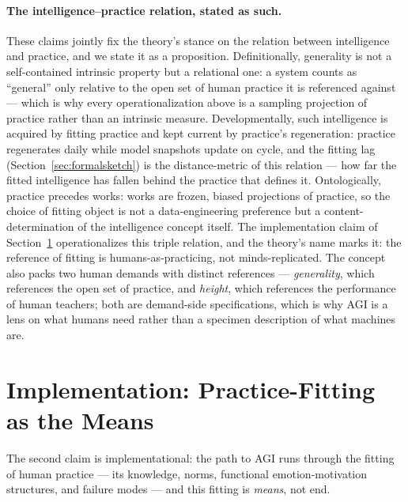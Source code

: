 \documentclass[10pt]{article}
\begin{document}
\paragraph{The intelligence--practice relation, stated as such.}
These claims jointly fix the theory's stance on the relation between intelligence and practice, and we state it as a proposition. Definitionally, generality is not a self-contained intrinsic property but a relational one: a system counts as ``general'' only relative to the open set of human practice it is referenced against --- which is why every operationalization above is a sampling projection of practice rather than an intrinsic measure. Developmentally, such intelligence is acquired by fitting practice and kept current by practice's regeneration: practice regenerates daily while model snapshots update on cycle, and the fitting lag (Section~\ref{sec:formalsketch}) is the distance-metric of this relation --- how far the fitted intelligence has fallen behind the practice that defines it. Ontologically, practice precedes works: works are frozen, biased projections of practice, so the choice of fitting object is not a data-engineering preference but a content-determination of the intelligence concept itself. The implementation claim of Section~\ref{sec:implementation} operationalizes this triple relation, and the theory's name marks it: the reference of fitting is humans-as-practicing, not minds-replicated. The concept also packs two human demands with distinct references --- \emph{generality}, which references the open set of practice, and \emph{height}, which references the performance of human teachers; both are demand-side specifications, which is why AGI is a lens on what humans need rather than a specimen description of what machines are.

\section{Implementation: Practice-Fitting as the Means}\label{sec:implementation}

The second claim is implementational: the path to AGI runs through the fitting of human practice --- its knowledge, norms, functional emotion-motivation structures, and failure modes --- and this fitting is \emph{means}, not end.
\end{document}
